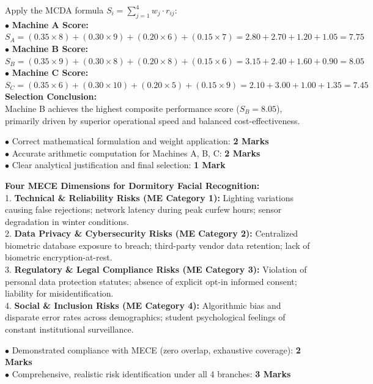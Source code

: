 \begin{solutionbox}
Apply the MCDA formula $S_i = \sum_{j=1}^4 w_j \cdot r_{ij}$:\\
$\bullet$ \textbf{Machine A Score:}\\
$S_A = (0.35 \times 8) + (0.30 \times 9) + (0.20 \times 6) + (0.15 \times 7) = 2.80 + 2.70 + 1.20 + 1.05 = \mathbf{7.75}$\\
$\bullet$ \textbf{Machine B Score:}\\
$S_B = (0.35 \times 9) + (0.30 \times 8) + (0.20 \times 8) + (0.15 \times 6) = 3.15 + 2.40 + 1.60 + 0.90 = \mathbf{8.05}$\\
$\bullet$ \textbf{Machine C Score:}\\
$S_C = (0.35 \times 6) + (0.30 \times 10) + (0.20 \times 5) + (0.15 \times 9) = 2.10 + 3.00 + 1.00 + 1.35 = \mathbf{7.45}$\\
\textbf{Selection Conclusion:}\\
Machine B achieves the highest composite performance score ($S_B = 8.05$), primarily driven by superior operational speed and balanced cost-effectiveness.
\begin{markingrubric}
$\bullet$ Correct mathematical formulation and weight application: \textbf{2 Marks}\\
$\bullet$ Accurate arithmetic computation for Machines A, B, C: \textbf{2 Marks}\\
$\bullet$ Clear analytical justification and final selection: \textbf{1 Mark}
\end{markingrubric}
\end{solutionbox}

\begin{solutionbox}
\textbf{Four MECE Dimensions for Dormitory Facial Recognition:}\\
1. \textbf{Technical \& Reliability Risks (ME Category 1):} Lighting variations causing false rejections; network latency during peak curfew hours; sensor degradation in winter conditions.\\
2. \textbf{Data Privacy \& Cybersecurity Risks (ME Category 2):} Centralized biometric database exposure to breach; third-party vendor data retention; lack of biometric encryption-at-rest.\\
3. \textbf{Regulatory \& Legal Compliance Risks (ME Category 3):} Violation of personal data protection statutes; absence of explicit opt-in informed consent; liability for misidentification.\\
4. \textbf{Social \& Inclusion Risks (ME Category 4):} Algorithmic bias and disparate error rates across demographics; student psychological feelings of constant institutional surveillance.
\begin{markingrubric}
$\bullet$ Demonstrated compliance with MECE (zero overlap, exhaustive coverage): \textbf{2 Marks}\\
$\bullet$ Comprehensive, realistic risk identification under all 4 branches: \textbf{3 Marks}
\end{markingrubric}
\end{solutionbox}

